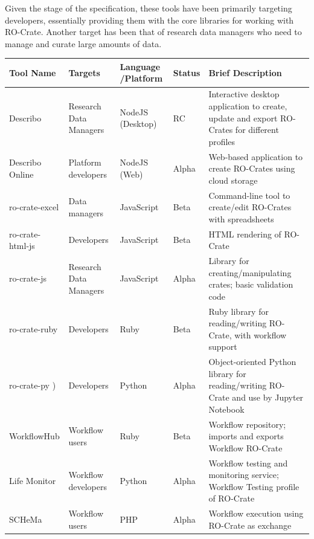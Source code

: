 Given the stage of the specification, these tools have been primarily
targeting developers, essentially providing them with the core libraries
for working with RO-Crate. Another target has been that of research data
managers who need to manage and curate large amounts of data.

\small
\begin{longtable}[]{@{}
  >{\raggedright\arraybackslash}p{}
  >{\raggedright\arraybackslash}p{}
  >{\raggedright\arraybackslash}p{}
  >{\raggedright\arraybackslash}p{}
  >{\raggedright\arraybackslash}p{}@{}}
\toprule
Tool Name & Targets & Language /Platform & Status & Brief Description \\
\midrule
\endhead
Describo \cite{ch5-78} &
Research Data Managers & NodeJS (Desktop) & RC & Interactive desktop
application to create, update and export RO-Crates for different
profiles \\
Describo Online
\cite{ch5-77} &
Platform developers & NodeJS (Web) & Alpha & Web-based application to
create RO-Crates using cloud storage \\
ro-crate-excel
\cite{ch5-84} & Data
managers & JavaScript & Beta & Command-line tool to create/edit
RO-Crates with spreadsheets \\
ro-crate-html-js
\cite{ch5-95} &
Developers & JavaScript & Beta & HTML rendering of RO-Crate \\
ro-crate-js
\cite{ch5-49} & Research
Data Managers & JavaScript & Alpha & Library for creating/manipulating
crates; basic validation code \\
ro-crate-ruby
\cite{Bacall 2022b} &
Developers & Ruby & Beta & Ruby library for reading/writing RO-Crate,
with workflow support \\
ro-crate-py \cite{Droesbeke 2022}) &
Developers & Python & Alpha & Object-oriented Python library for
reading/writing RO-Crate and use by Jupyter Notebook \\
WorkflowHub \cite{ch5-124} & Workflow
users & Ruby & Beta & Workflow repository; imports and exports Workflow
RO-Crate \\
Life Monitor \cite{CRS4 2022} & Workflow
developers & Python & Alpha & Workflow testing and monitoring service;
Workflow Testing profile of RO-Crate \\
SCHeMa \cite{ch5-118} & Workflow
users & PHP & Alpha & Workflow execution using RO-Crate as exchange

\end{longtable}
